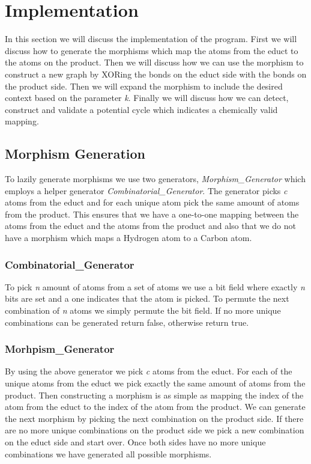 \documentclass{article}
\begin{document}
\newpage
\section{Implementation}

In this section we will discuss the implementation of the program. First we will discuss how to generate the morphisms which map the atoms from the educt to the atoms on the product. Then we will discuss how we can use the morphism to construct a new graph by XORing the bonds on the educt side with the bonds on the product side. Then we will expand the morphism to include the desired context based on the parameter \textit{k}. Finally we will discuss how we can detect, construct and validate a potential cycle which indicates a chemically valid mapping. 

\subsection{Morphism Generation}

To lazily generate morphisms we use two generators, \textit{Morphism\_Generator} which employs a helper generator \textit{Combinatorial\_Generator}. The generator picks \textit{c} atoms from the educt and for each unique atom pick the same amount of atoms from the product. This ensures that we have a one-to-one mapping between the atoms from the educt and the atoms from the product and also that we do not have a morphism which maps a Hydrogen atom to a Carbon atom.

\subsubsection{Combinatorial\_Generator}

To pick \textit{n} amount of atoms from a set of atoms we use a bit field where exactly \textit{n} bits are set and a one indicates that the atom is picked. To permute the next combination of \textit{n} atoms we simply permute the bit field. If no more unique combinations can be generated return false, otherwise return true.


\subsubsection{Morhpism\_Generator}

By using the above generator we pick \textit{c} atoms from the educt. For each of the unique atoms from the educt we pick exactly the same amount of atoms from the product. Then constructing a morphism is as simple as mapping the index of the atom from the educt to the index of the atom from the product. We can generate the next morphism by picking the next combination on the product side. If there are no more unique combinations on the product side we pick a new combination on the educt side and start over. Once both sides have no more unique combinations we have generated all possible morphisms. 
\end{document}
